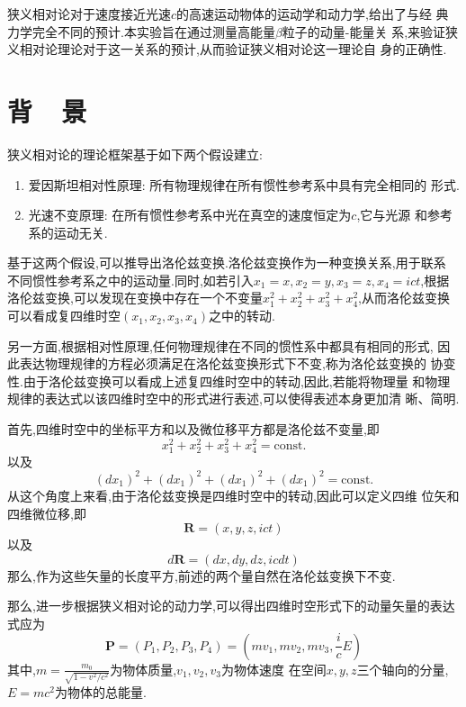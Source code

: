 \documentclass[aps,pre,12pt,preprint,onecolumn,showpacs,showkeys]{revtex4-1}
\begin{document}
狭义相对论对于速度接近光速$c$的高速运动物体的运动学和动力学,给出了与经
典力学完全不同的预计.本实验旨在通过测量高能量$\beta$粒子的动量-能量关
系,来验证狭义相对论理论对于这一关系的预计,从而验证狭义相对论这一理论自
身的正确性.

\section{背~~景}

狭义相对论的理论框架基于如下两个假设建立:

\begin{enumerate}
\item 爱因斯坦相对性原理: 所有物理规律在所有惯性参考系中具有完全相同的
  形式.
\item 光速不变原理: 在所有惯性参考系中光在真空的速度恒定为$c$,它与光源
  和参考系的运动无关.
\end{enumerate}

基于这两个假设,可以推导出洛伦兹变换.洛伦兹变换作为一种变换关系,用于联系
不同惯性参考系之中的运动量.同时,如若引入$x_1 = x, x_2 = y, x_3 = z,
x_4 = ict$,根据洛伦兹变换,可以发现在变换中存在一个不变量$x_1^2 + x_2^2
+ x_3^2 + x_4^2$,从而洛伦兹变换可以看成复四维时空$(x_1, x_2, x_3,
x_4)$之中的转动.

另一方面,根据相对性原理,任何物理规律在不同的惯性系中都具有相同的形式,
因此表达物理规律的方程必须满足在洛伦兹变换形式下不变,称为洛伦兹变换的
协变性.由于洛伦兹变换可以看成上述复四维时空中的转动,因此,若能将物理量
和物理规律的表达式以该四维时空中的形式进行表述,可以使得表述本身更加清
晰、简明.

首先,四维时空中的坐标平方和以及微位移平方都是洛伦兹不变量,即
\begin{equation}
  \label{eq:const1}
  x_1^2 + x_2^2 + x_3^2 + x_4^2 = \text{const.}
\end{equation}
以及
\begin{equation}
  \label{eq:const2}
  (dx_1)^2 + (dx_1)^2 + (dx_1)^2 + (dx_1)^2 = \text{const.}
\end{equation}
从这个角度上来看,由于洛伦兹变换是四维时空中的转动,因此可以定义四维
位矢和四维微位移,即
\begin{equation}
  \label{eq:4vecr}
  \bm{R} = (x,y,z,ict)
\end{equation}
以及
\begin{equation}
  \label{eq:4vecdr}
  d\bm{R} = (dx,dy,dz,icdt)
\end{equation}
那么,作为这些矢量的长度平方,前述的两个量自然在洛伦兹变换下不变.

那么,进一步根据狭义相对论的动力学,可以得出四维时空形式下的动量矢量的表达
式应为
\begin{equation}
  \label{eq:4vecp}
  \bm{P} = (P_1, P_2, P_3, P_4) =  (mv_1,mv_2,mv_3, \frac{i}{c}E)
\end{equation}
其中,$m = \frac{m_0}{\sqrt{1-v^2/c^2}}$为物体质量,$v_1,v_2,v_3$为物体速度
在空间$x,y,z$三个轴向的分量,$E=mc^2$为物体的总能量.
\end{document}
